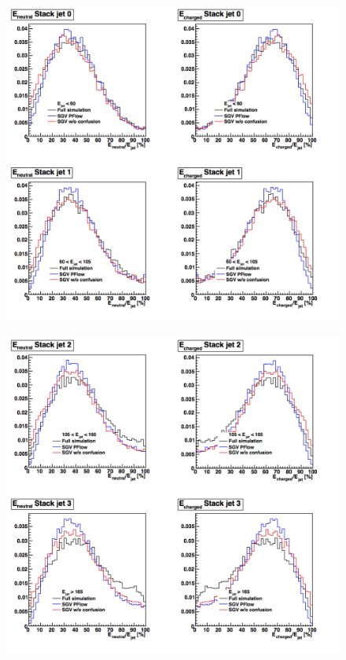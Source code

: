 \documentclass[a4paper,12pt]{article}
\begin{document}
\noindent
\begin{minipage}{\linewidth}
\centering
\begin{minipage}{0.4\linewidth}
\begin{figure}[H]
    \includegraphics[width=\linewidth]{EneuEcha_binned_1.png}
\end{figure}
\end{minipage}
      \hspace{0.05\linewidth}
      \begin{minipage}{0.4\linewidth}
\begin{figure}[H]
    \includegraphics[width=\linewidth]{EneuEcha_binned_2.png} 
\end{figure}
\end{minipage}
   \label{fig:energy_distrib}
\end{minipage}\\[0.5cm]
\end{document}
